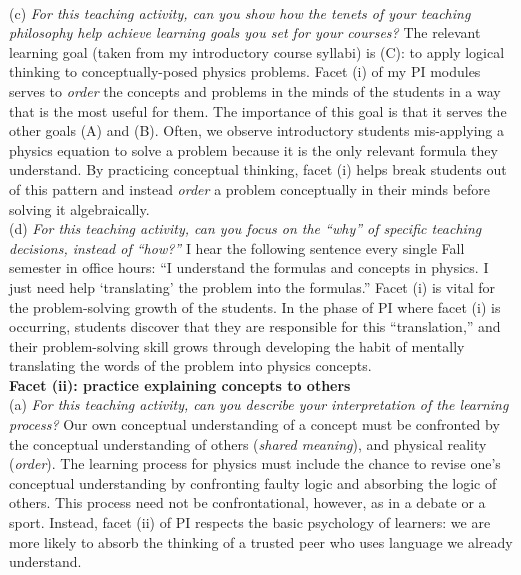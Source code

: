 \documentclass[../../../main.tex]{subfiles}
\begin{document}
\\
\vspace{0.25cm}
(c) \textit{For this teaching activity, can you show how the tenets of your teaching philosophy help achieve learning goals you set for your courses?}  The relevant learning goal (taken from my introductory course syllabi) is (C): to apply logical thinking to conceptually-posed physics problems.  Facet (i) of my PI modules serves to \textit{order} the concepts and problems in the minds of the students in a way that is the most useful for them.  The importance of this goal is that it serves the other goals (A) and (B).  Often, we observe introductory students mis-applying a physics equation to solve a problem because it is the only relevant formula they understand.  By practicing conceptual thinking, facet (i) helps break students out of this pattern and instead \textit{order} a problem conceptually in their minds before solving it algebraically.
\\
\vspace{0.25cm}
(d) \textit{For this teaching activity, can you focus on the ``why'' of specific teaching decisions, instead of ``how?''}  I hear the following sentence every single Fall semester in office hours: ``I understand the formulas and concepts in physics.  I just need help `translating' the problem into the formulas.''  Facet (i) is vital for the problem-solving growth of the students.  In the phase of PI where facet (i) is occurring, students discover that they are responsible for this ``translation,'' and their problem-solving skill grows through developing the habit of mentally translating the words of the problem into physics concepts.
\\
\vspace{0.25cm}
\textbf{Facet (ii): practice explaining concepts to others} 
\\
\vspace{0.25cm}
(a) \textit{For this teaching activity, can you describe your interpretation of the learning process?} Our own conceptual understanding of a concept must be confronted by the conceptual understanding of others (\textit{shared meaning}), and physical reality (\textit{order}).  The learning process for physics must include the chance to revise one's conceptual understanding by confronting faulty logic and absorbing the logic of others.  This process need not be confrontational, however, as in a debate or a sport.  Instead, facet (ii) of PI respects the basic psychology of learners: we are more likely to absorb the thinking of a trusted peer who uses language we already understand.
\end{document}

